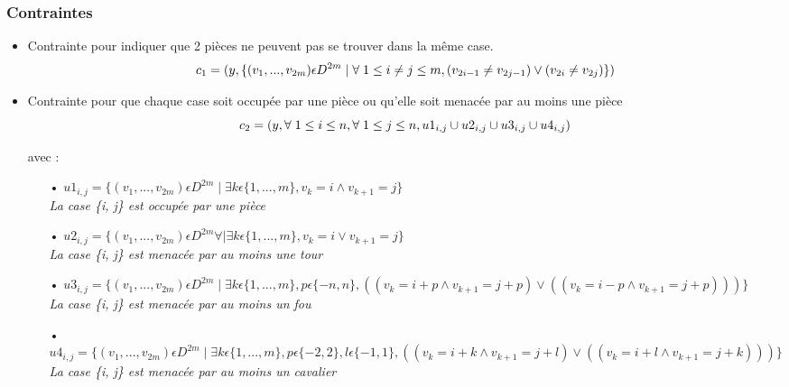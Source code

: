 \documentclass[a4paper,11pt]{article}
\begin{document}
\subsubsection{Contraintes}
\begin{itemize}
\item Contrainte pour indiquer que 2 pièces ne peuvent pas se trouver dans la même case.
   $$c_{1} = ( y, \{ (v_{1}, ..., v_{2m}) \epsilon  D^{2m} \mid \forall \hspace{0.1cm} 1\leq i \neq j \leq m, (v_{2i-1} \neq v_{2j-1}) \vee  (v_{2i} \neq v_{2j}) \} )$$ 

 \item Contrainte pour que chaque case soit occupée par une pièce ou qu'elle soit menacée par au moins une pièce
    $$c_{2} = (y, \forall \hspace{0.1cm} 1 \leq i \leq n, \forall \hspace{0.1cm} 1 \leq j \leq n,  u1_{i,j} \cup u2_{i,j} \cup u3_{i,j} \cup u4_{i,j})$$
    
    avec : \begin{itemize}
    \item[•] $u1_{i,j} = \{(v_{1}, ..., v_{2m}) \epsilon  D^{2m} \mid \exists k \epsilon \{1, ..., m\}, v_{k} = i \wedge v_{k+1} = j\}$ \\
    \textit{La case \{i, j\} est occupée par une pièce}\\
   
   
    \item[•] $u2_{i,j} = \{(v_{1}, ..., v_{2m}) \epsilon  D^{2m} \forall \mid \exists k \epsilon \{1, ..., m\}, v_{k} = i \vee v_{k+1} = j\}$ \\
    \textit{La case \{i, j\} est menacée par au moins une tour}\\
    
    
    \item[•] $u3_{i,j} = \{(v_{1}, ..., v_{2m}) \epsilon  D^{2m} \mid \exists k \epsilon \{1, ..., m\}, p \epsilon\{-n, n \}, ((v_{k} = i+p \wedge v_{k+1} = j+p) \vee ((v_{k} = i-p \wedge v_{k+1} = j+p))) \}$ \\
    \textit{La case \{i, j\} est menacée par au moins un fou}\\
    
    
    \item[•] $u4_{i,j} = \{(v_{1}, ..., v_{2m}) \epsilon  D^{2m} \mid \exists k \epsilon \{1, ..., m\}, p \epsilon \{-2, 2 \}, l \epsilon \{-1, 1\},
    ((v_{k} = i+k \wedge v_{k+1} = j+l)  \vee ((v_{k} = i+l \wedge v_{k+1} = j+k)))\}$ \\
    \textit{La case \{i, j\} est menacée par au moins un cavalier}\\
    

\end{itemize}
\end{itemize}
\end{document}
